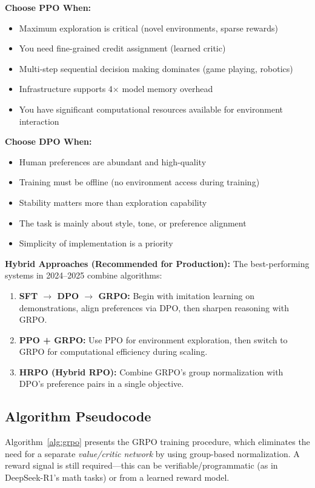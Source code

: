\documentclass[12pt,a4paper]{report}
\theoremstyle{definition}
\begin{document}
\noindent\textbf{Choose PPO When:}
\begin{itemize}
    \item Maximum exploration is critical (novel environments, sparse rewards)
    \item You need fine-grained credit assignment (learned critic)
    \item Multi-step sequential decision making dominates (game playing, robotics)
    \item Infrastructure supports 4$\times$ model memory overhead
    \item You have significant computational resources available for environment interaction
\end{itemize}

\noindent\textbf{Choose DPO When:}
\begin{itemize}
    \item Human preferences are abundant and high-quality
    \item Training must be offline (no environment access during training)
    \item Stability matters more than exploration capability
    \item The task is mainly about style, tone, or preference alignment
    \item Simplicity of implementation is a priority
\end{itemize}

\noindent\textbf{Hybrid Approaches (Recommended for Production):} The best-performing systems in 2024--2025 combine algorithms:
\begin{enumerate}
    \item \textbf{SFT $\rightarrow$ DPO $\rightarrow$ GRPO:} Begin with imitation learning on demonstrations, align preferences via DPO, then sharpen reasoning with GRPO.
    \item \textbf{PPO + GRPO:} Use PPO for environment exploration, then switch to GRPO for computational efficiency during scaling.
    \item \textbf{HRPO (Hybrid RPO):} Combine GRPO's group normalization with DPO's preference pairs in a single objective.
\end{enumerate}

\subsection{Algorithm Pseudocode}
Algorithm~\ref{alg:grpo} presents the GRPO training procedure, which eliminates the need for a separate \emph{value/critic network} by using group-based normalization. A reward signal is still required---this can be verifiable/programmatic (as in DeepSeek-R1's math tasks) or from a learned reward model.
\end{document}
